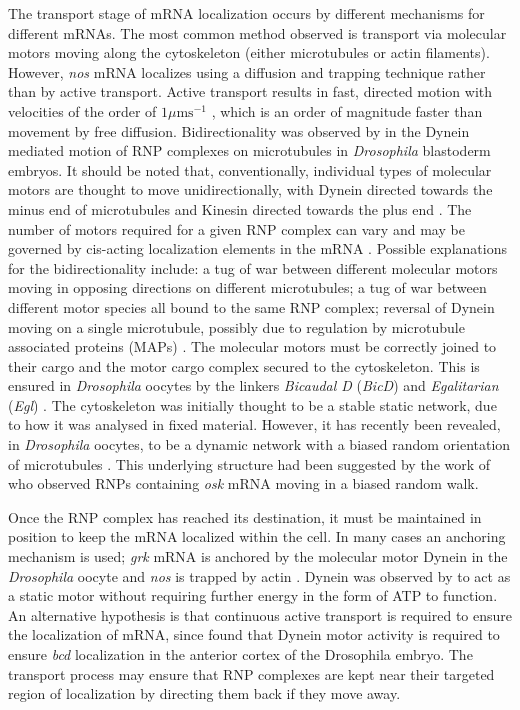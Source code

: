 \documentclass[twocolumn]{biophys}
\begin{document}
The transport stage of mRNA localization occurs by different mechanisms for different mRNAs.
The most common method observed is transport via molecular motors moving along the cytoskeleton (either microtubules or actin filaments). 
However, \textit{nos} mRNA localizes using a diffusion and trapping technique \citep{forrest2003live} rather than by active transport. 
Active transport results in fast, directed motion with velocities of the order of $1 \mu \text{m} \text{s}^{-1}$ \citep{weil2006localization, zimyanin2008vivo, DavidsonPhD2015}, which is an order of magnitude faster than movement by free diffusion.
Bidirectionality was observed by \citet{vendra2007dynactin} in the Dynein mediated motion of RNP complexes on microtubules in \textit{Drosophila} blastoderm embryos.
It should be noted that, conventionally, individual types of molecular motors are thought to move unidirectionally, with Dynein directed towards the minus end of microtubules and Kinesin directed towards the plus end \citep{howard2001mechanics}.
The number of motors required for a given RNP complex can vary and may be governed by cis-acting localization elements in the mRNA \citep{amrute2012single}.
Possible explanations for the bidirectionality include: a tug of war between different molecular motors moving in opposing directions on different microtubules; a tug of war between different motor species all bound to the same RNP complex; reversal of Dynein moving on a single microtubule, possibly due to regulation by microtubule associated proteins (MAPs) \citep{buxbaum2015right}. 
The molecular motors must be correctly joined to their cargo and the motor cargo complex secured to the cytoskeleton.
This is ensured in \textit{Drosophila} oocytes by the linkers \textit{Bicaudal D} (\textit{BicD}) and \textit{Egalitarian} (\textit{Egl}) \citep{parton2014subcellular}. 
The cytoskeleton was initially thought to be a stable static network, due to how it was analysed in fixed material.
However, it has recently been revealed, in \textit{Drosophila} oocytes, to be a dynamic network with a biased random orientation of microtubules \citep{parton20111}.
This underlying structure had been suggested by the work of \citet{zimyanin2008vivo} who observed RNPs containing \textit{osk} mRNA moving in a biased random walk.  

Once the RNP complex has reached its destination, it must be maintained in position to keep the mRNA localized within the cell.
In many cases an anchoring mechanism is used; \textit{grk} mRNA is anchored by the molecular motor Dynein \citep{delanoue2005dynein} in the \textit{Drosophila} oocyte and \textit{nos} is trapped by actin \citep{forrest2003live}.
Dynein was observed by \citet{delanoue2005dynein} to act as a static motor without requiring further energy in the form of ATP to function. 
An alternative hypothesis is that continuous active transport is required to ensure the localization of mRNA, since \citet{weil2006localization} found that Dynein motor activity is required to ensure \textit{bcd} localization in the anterior cortex of the Drosophila embryo.
The transport process may ensure that RNP complexes are kept near their targeted region of localization by directing them back if they move away.
\end{document}
